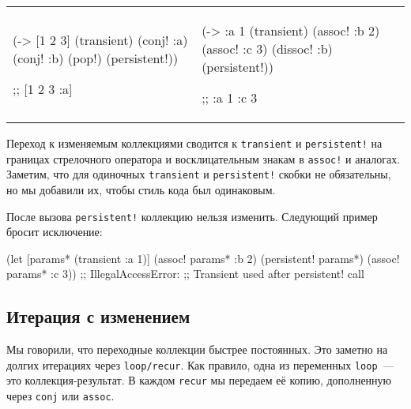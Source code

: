 \else

\begin{english}

\noindent
\begin{tabular}{ @{}p{5cm} @{}p{5cm} }

  \begin{clojure}
(-> [1 2 3]
    (transient)
    (conj! :a)
    (conj! :b)
    (pop!)
    (persistent!))

;; [1 2 3 :a]
  \end{clojure}

&

  \begin{clojure}
(-> {:a 1}
    (transient)
    (assoc! :b 2)
    (assoc! :c 3)
    (dissoc! :b)
    (persistent!))

;; {:a 1 :c 3}
  \end{clojure}

\end{tabular}

\end{english}

\fi

Переход к изменяемым коллекциями сводится к \verb|transient| и
\verb|persistent!| на границах стрелочного оператора и восклицательным знакам в
\verb|assoc!| и аналогах. Заметим, что для одиночных \verb|transient| и
\verb|persistent!| скобки не обязательны, но мы добавили их, чтобы стиль кода
был одинаковым.

После вызова \verb|persistent!| коллекцию нельзя изменить. Следующий пример
бросит исключение:

\begin{english}
  \begin{clojure}
(let [params* (transient {:a 1})]
  (assoc! params* :b 2)
  (persistent! params*)
  (assoc! params* :c 3))
;; IllegalAccessError:
;; Transient used after persistent! call
  \end{clojure}
\end{english}

\subsection{Итерация с изменением}


Мы говорили, что переходные коллекции быстрее постоянных. Это заметно на долгих
итерациях через \verb|loop/recur|. Как правило, одна из переменных
\verb|loop|~--- это коллекция-результат. В каждом \verb|recur| мы передаем её
копию, дополненную через \verb|conj| или \verb|assoc|.

